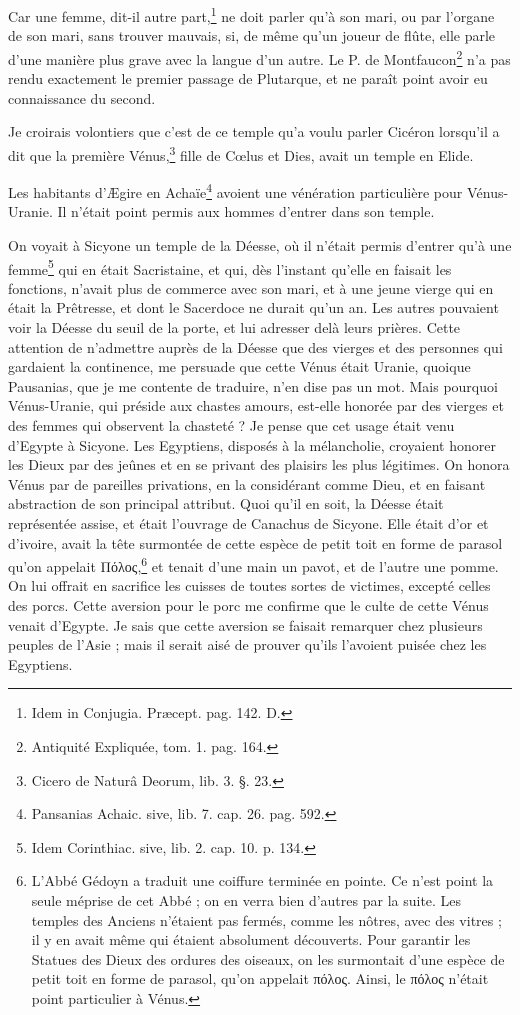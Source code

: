 \documentclass[a4paper, 18pt, oneside]{article}
\begin{document}
Car une femme, dit-il autre part,\footnote{Idem in Conjugia. Præcept. pag. 142. D.} ne doit parler qu'à son mari, ou par l'organe de son mari, sans trouver mauvais, si, de même qu'un joueur de flûte, elle parle d'une manière plus grave avec la langue d'un autre. Le P. de Montfaucon\footnote{Antiquité Expliquée, tom. 1. pag. 164.} n'a pas rendu exactement le premier passage de Plutarque, et ne paraît point avoir eu connaissance du second.

Je croirais volontiers que c'est de ce temple qu'a voulu parler Cicéron lorsqu'il a dit que la première Vénus,\footnote{Cicero de Naturâ Deorum, lib. 3. §. 23.} fille de Cœlus et Dies, avait un temple en Elide.

Les habitants d'Ægire en Achaïe\footnote{Pansanias Achaic. sive, lib. 7. cap. 26. pag. 592.} avoient une vénération particulière pour Vénus-Uranie. Il n'était point permis aux hommes d'entrer dans son temple.

On voyait à Sicyone un temple de la Déesse, où il n'était permis d'entrer qu'à une femme\footnote{Idem Corinthiac. sive, lib. 2. cap. 10. p. 134.} qui en était Sacristaine, et qui, dès l'instant qu'elle en faisait les fonctions, n'avait plus de commerce avec son mari, et à une jeune vierge qui en était la Prêtresse, et dont le Sacerdoce ne durait qu'un an. Les autres pouvaient voir la Déesse du seuil de la porte, et lui adresser delà leurs prières. Cette attention de n'admettre auprès de la Déesse que des vierges et des personnes qui gardaient la continence, me persuade que cette Vénus était Uranie, quoique Pausanias, que je me contente de traduire, n'en dise pas un mot. Mais pourquoi Vénus-Uranie, qui préside aux chastes amours, est-elle honorée par des vierges et des femmes qui observent la chasteté ? Je pense que cet usage était venu d'Egypte à Sicyone. Les Egyptiens, disposés à la mélancholie, croyaient honorer les Dieux par des jeûnes et en se privant des plaisirs les plus légitimes. On honora Vénus par de pareilles privations, en la considérant comme Dieu, et en faisant abstraction de son principal attribut. Quoi qu'il en soit, la Déesse était représentée assise, et était l'ouvrage de Canachus de Sicyone. Elle était d'or et d'ivoire, avait la tête surmontée de cette espèce de petit toit en forme de parasol qu'on appelait Πόλος,\footnote{L'Abbé Gédoyn a traduit une coiffure terminée en pointe. Ce n'est point la seule méprise de cet Abbé ; on en verra bien d'autres par la suite. Les temples des Anciens n'étaient pas fermés, comme les nôtres, avec des vitres ; il y en avait même qui étaient absolument découverts. Pour garantir les Statues des Dieux des ordures des oiseaux, on les surmontait d'une espèce de petit toit en forme de parasol, qu'on appelait πόλος. Ainsi, le πόλος n'était point particulier à Vénus.} et tenait d'une main un pavot, et de l'autre une pomme. On lui offrait en sacrifice les cuisses de toutes sortes de victimes, excepté celles des porcs. Cette aversion pour le porc me confirme que le culte de cette Vénus venait d'Egypte. Je sais que cette aversion se faisait remarquer chez plusieurs peuples de l'Asie ; mais il serait aisé de prouver qu'ils l'avoient puisée chez les Egyptiens.
\end{document}
